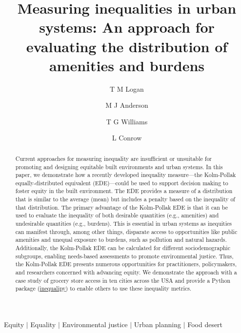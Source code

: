 \documentclass[final,3p,times,onecolumn,sort&compress]{elsarticle}
\begin{document}
\begin{frontmatter}

\title{Measuring inequalities in urban systems: An approach for evaluating the distribution of amenities and burdens}

\author[1,4]{T M Logan}
\author[1,4]{M J Anderson}
\author[2]{T G Williams}
\author[3,4]{L Conrow}

\address[1]{Civil and Natural Resources Engineering, University of Canterbury, New Zealand}
\address[2]{Industrial and Operations Engineering, University of Michigan, Ann Arbor, USA}
\address[3]{Earth and Environment, University of Canterbury, New Zealand}
\address[4]{The Cluster for Community and Urban Resilience, University of Canterbury, New Zealand}

\begin{abstract}
Current approaches for measuring inequality are insufficient or unsuitable for promoting and designing equitable built environments and urban systems.
In this paper, we demonstrate how a recently developed inequality measure---the Kolm-Pollak equally-distributed equivalent (EDE)---could be used to support decision making to foster equity in the built environment.
The EDE provides a measure of a distribution that is similar to the average (mean) but includes a penalty based on the inequality of that distribution.
The primary advantage of the Kolm-Pollak EDE is that it can be used to evaluate the inequality of both desirable quantities (e.g., amenities) and undesirable quantities (e.g., burdens).
This is essential in urban systems as inequities can manifest through, among other things, disparate access to opportunities like public amenities and unequal exposure to burdens, such as pollution and natural hazards.
Additionally, the Kolm-Pollak EDE can be calculated for different sociodemographic subgroups, enabling needs-based assessments to promote environmental justice.
Thus, the Kolm-Pollak EDE presents numerous opportunities for practitioners, policymakers, and researchers concerned with advancing equity.
We demonstrate the approach with a case study of grocery store access in ten cities across the USA and provide a Python package (\href{https://pypi.org/project/inequalipy/}{inequalipy}) to enable others to use these inequality metrics.
\end{abstract}

\begin{keyword}
Equity $|$ Equality $|$ Environmental justice $|$ Urban planning $|$ Food desert 
\end{keyword}

\end{frontmatter}
\end{document}
